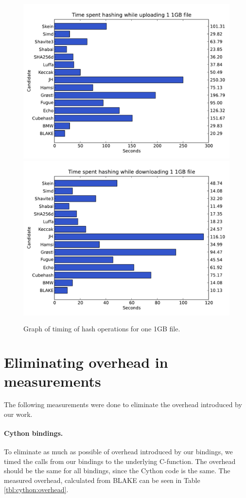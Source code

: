 \documentclass[english,12pt,a4paper]{book}
\begin{document}
\begin{figure}[h!]
    \centering
    \includegraphics[width=0.9\columnwidth]
        {graphs/Timespenthashingwhileuploading11GBfile.pdf}
    \includegraphics[width=0.9\columnwidth]
        {graphs/Timespenthashingwhiledownloading11GBfile.pdf}
    \caption{Graph of timing of hash operations for one 1GB file.}
    \label{fig:graph:11gb}
\end{figure}

\section{Eliminating overhead in measurements}

The following measurements were done to eliminate the overhead introduced by
our work.

\paragraph{Cython bindings.}
To eliminate as much as possible of overhead introduced by our bindings, we
timed the calls from our bindings to the underlying C-function. The overhead
should be the same for all bindings, since the Cython code is the same. The
measured overhead, calculated from BLAKE can be seen in Table
\ref{tbl:cython:overhead}.
\end{document}
